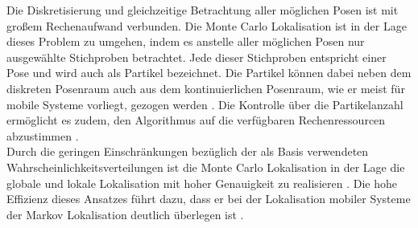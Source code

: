Die Diskretisierung und gleichzeitige Betrachtung aller möglichen Posen ist mit großem Rechenaufwand verbunden. Die Monte Carlo Lokalisation ist in der Lage dieses Problem zu umgehen, indem es anstelle aller möglichen Posen nur ausgewählte Stichproben betrachtet. Jede dieser Stichproben entspricht einer Pose und wird auch als Partikel bezeichnet. Die Partikel können dabei neben dem diskreten Posenraum auch aus dem kontinuierlichen Posenraum, wie er meist für mobile Systeme vorliegt, gezogen werden \cite{Fox2001}. Die Kontrolle über die Partikelanzahl ermöglicht es zudem, den Algorithmus auf die verfügbaren Rechenressourcen abzustimmen \cite{Thrun2001}.\\
Durch die geringen Einschränkungen bezüglich der als Basis verwendeten Wahrscheinlichkeitsverteilungen ist die Monte Carlo Lokalisation in der Lage die globale und lokale Lokalisation mit hoher Genauigkeit zu realisieren \cite{Thrun2005}. Die hohe Effizienz dieses Ansatzes führt dazu, dass er bei der Lokalisation mobiler Systeme der Markov Lokalisation deutlich überlegen ist \cite{Fox2001}.




